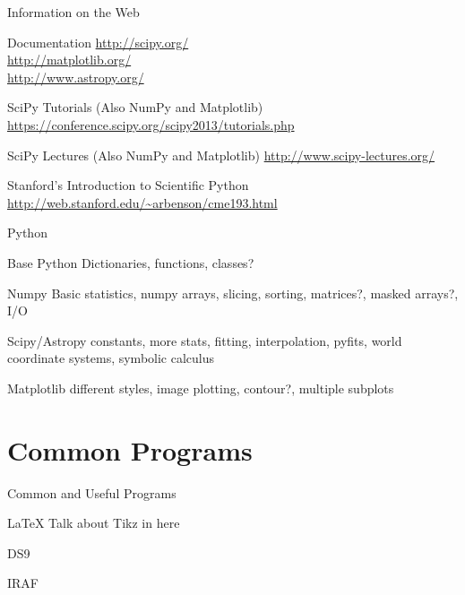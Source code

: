 \documentclass{beamer}
\begin{document}
\begin{frame}{Information on the Web}
  \begin{block}{Documentation}
    \url{http://scipy.org/} \\
    \url{http://matplotlib.org/} \\
    \url{http://www.astropy.org/}
  \end{block}

  \begin{block}{SciPy Tutorials (Also NumPy and Matplotlib)}
    \url{https://conference.scipy.org/scipy2013/tutorials.php}
  \end{block}
  
  \begin{block}{SciPy Lectures (Also NumPy and Matplotlib)}
    \url{http://www.scipy-lectures.org/}
  \end{block}
  
  \begin{block}{Stanford's Introduction to Scientific Python}
    \url{http://web.stanford.edu/~arbenson/cme193.html}
  \end{block}
  
\end{frame}

\begin{frame}{Python}
  \begin{block}{Base Python}
     Dictionaries, functions, classes?
  \end{block}

  \begin{block}{Numpy}
      Basic statistics, numpy arrays, slicing, sorting, matrices?, masked arrays?, I/O
  \end{block}

  \begin{block}{Scipy/Astropy}
     constants, more stats, fitting, interpolation, pyfits, world coordinate systems, symbolic calculus
  \end{block}

  \begin{block}{Matplotlib}
     different styles, image plotting, contour?, multiple subplots
  \end{block}
\end{frame}

\section{Common Programs}

\begin{frame}{Common and Useful Programs}
  \begin{block}{LaTeX}
    Talk about Tikz in here
  \end{block}
  \begin{block}{DS9}
  \end{block}
  \begin{block}{IRAF}
  \end{block}
\end{frame}
\end{document}
